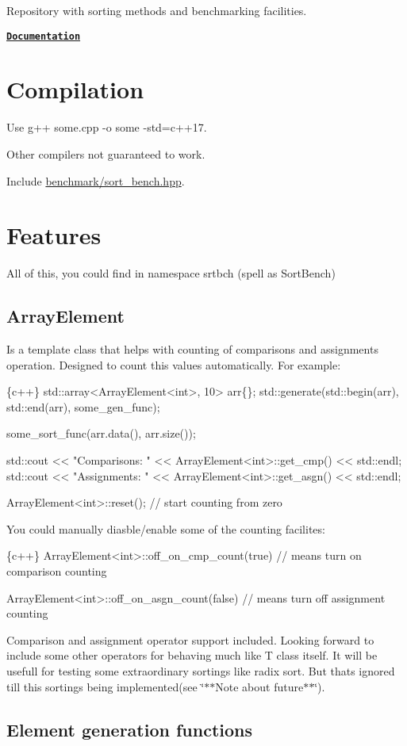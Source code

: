 Repository with sorting methods and benchmarking facilities.

\href{https://b1z0n.github.io/SortingBenchmark/}{\tt {\bfseries Documentation}}

\section*{Compilation}

Use {\ttfamily g++ some.\+cpp -\/o some -\/std=c++17}.

Other compilers not guaranteed to work.

Include {\ttfamily \hyperlink{sort__bench_8hpp}{benchmark/sort\+\_\+bench.\+hpp}}. \section*{Features}

All of this, you could find in namespace {\ttfamily srtbch} (spell as Sort\+Bench) \subsection*{Array\+Element}

Is a template class that helps with counting of comparisons and assignments operation. Designed to count this values automatically. For example\+: 
\begin{DoxyCode}
\{c++\}
std::array<ArrayElement<int>, 10> arr\{\};
std::generate(std::begin(arr), std::end(arr), some\_gen\_func);

some\_sort\_func(arr.data(), arr.size());

std::cout << "Comparisons: " << ArrayElement<int>::get\_cmp()  << std::endl;
std::cout << "Assignments: " << ArrayElement<int>::get\_asgn() << std::endl;

ArrayElement<int>::reset();
// start counting from zero
\end{DoxyCode}
 You could manually diasble/enable some of the counting facilites\+: 
\begin{DoxyCode}
\{c++\}
ArrayElement<int>::off\_on\_cmp\_count(true)   
// means turn on comparison counting

ArrayElement<int>::off\_on\_asgn\_count(false) 
// means turn off assignment counting
\end{DoxyCode}
 Comparison and assignment operator support included. Looking forward to include some other operators for behaving much like T class itself. It will be usefull for testing some extraordinary sortings like radix sort. But that\textquotesingle{}s ignored till this sortings being implemented(see \char`\"{}$\ast$$\ast$\+Note about future$\ast$$\ast$\char`\"{}). \subsection*{Element generation functions}

